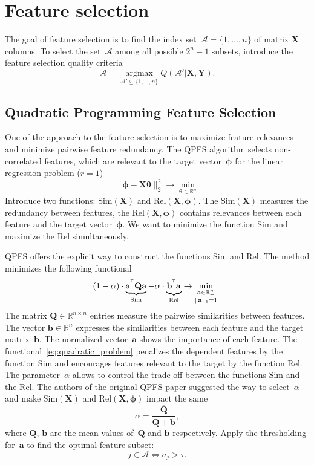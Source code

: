 \documentclass[12pt,twoside]{article}
\newcommand{\ba}{\mathbf{a}}
\newcommand{\bb}{\mathbf{b}}
\newcommand{\bY}{\mathbf{Y}}
\newcommand{\bX}{\mathbf{X}}
\newcommand{\bQ}{\mathbf{Q}}
\newcommand{\bbR}{\mathbb{R}}
\newcommand{\cA}{\mathcal{A}}
\newcommand{\bphi}{\boldsymbol{\phi}}
\newcommand{\btheta}{\boldsymbol{\theta}}
\newcommand{\T}{^{\text{\tiny\sffamily\upshape\mdseries T}}}
\newcommand{\argmax}{\mathop{\arg \max}\limits}
\begin{document}
 \section{Feature selection}
 The goal of feature selection is to find the index set~$\cA = \{1, \dots, n\}$ of matrix $\bX$ columns. To select the set~$\cA$ among all possible $2^n - 1$ subsets, introduce the feature selection quality criteria
\begin{equation}
	\cA = \argmax_{\cA' \subseteq \{1, \dots, n\}} Q(\cA' | \bX, \bY).
	\label{eq:subset_selection}
\end{equation}

\subsection{Quadratic Programming Feature Selection}
One of the approach to the feature selection is to maximize feature relevances and minimize pairwise feature redundancy.
The QPFS algorithm selects non-correlated features, which are relevant to the target vector~$\bphi$ for the linear regression problem ($r=1$)
\begin{equation*}
	\| \bphi - \bX \btheta\|_2^2 \rightarrow\min_{\btheta \in \bbR^{n}}.
\end{equation*}
Introduce two functions: $\text{Sim}(\bX)$ and $\text{Rel}(\bX, \bphi)$. 
The $\text{Sim}(\bX)$ measures the redundancy between features, the $\text{Rel}(\bX, \bphi)$ contains relevances between each feature and the target vector~$\bphi$. 
We want to minimize the function Sim and maximize the Rel simultaneously.

QPFS offers the explicit way to construct the functions Sim and Rel. 
The method minimizes the following functional
\begin{equation}
	(1 - \alpha) \cdot \underbrace{\ba^{\T} \bQ \ba}_{\text{Sim}} - \alpha \cdot \underbrace{\vphantom{()} \mathbf{b}^{\T} \ba}_{\text{Rel}} \rightarrow \min_{\substack{\ba \in \bbR^n_+ \\ \|\ba\|_1=1}}.
	\label{eq:quadratic_problem}
\end{equation}
The matrix $\bQ \in \bbR^{n \times n}$ entries measure the pairwise similarities between features. 
The vector $\mathbf{b} \in \bbR^n$ expresses the similarities between each feature and the target matrix~$\bb$.
The normalized vector~$\ba$ shows the importance of each feature. 
The functional~\eqref{eq:quadratic_problem} penalizes the dependent features by the function Sim and encourages features relevant to the target by the function Rel. 
The parameter~$\alpha$ allows to control the trade-off between the functions Sim and the Rel.
The authors of the original QPFS paper suggested the way to select~$\alpha$ and make $\text{Sim}(\bX)$ and $\text{Rel}(\bX, \bphi)$ impact the same
\begin{equation*}
	\alpha = \frac{\overline{\bQ}}{\overline{\bQ} + \overline{\bb}},
\end{equation*}
where $\overline{\bQ}$, $\overline{\bb}$ are the mean values of~$\bQ$ and $\bb$ respectively.
Apply the thresholding for~$\ba$ to find the optimal feature subset:
\[
	j \in \mathcal{A} \Leftrightarrow a_j > \tau.
\]
\end{document}
